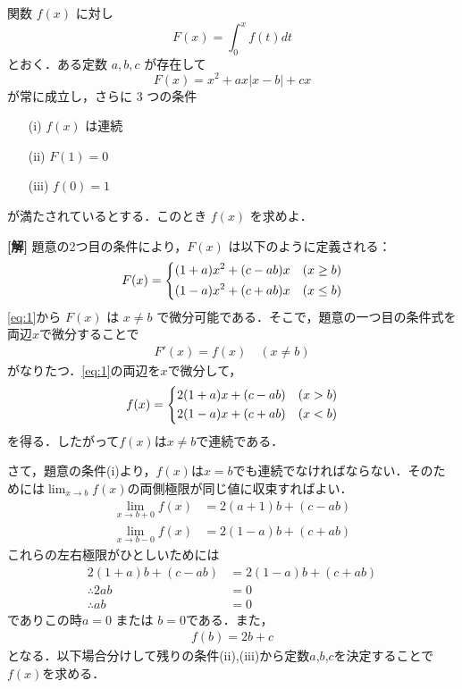 \documentclass[a4paper,10pt]{ltjsarticle}
\begin{document}
\begin{oframed}
関数 $f(x)$ に対し
\[ F(x) = \int_0^x f(t)dt \]
とおく．ある定数 $a, b, c$ が存在して
\[ F(x) = x^2 + ax|x-b| + cx \]
が常に成立し，さらに $3$ つの条件
\begin{enumerate}
    \item[(i)] $f(x)$ は連続
    \item[(ii)] $F(1) = 0$
    \item[(iii)] $f(0) = 1$
\end{enumerate}
が満たされているとする．このとき $f(x)$ を求めよ．
\end{oframed}
\setlength{\columnseprule}{0.4pt}
\begin{multicols}{2}
{\bf[解]}
題意の2つ目の条件により，$F(x)$ は以下のように定義される：
\begin{align}\label{eq:1}
F(x) = 
\begin{dcases}
(1+a)x^2 + (c-ab)x & (x \ge b)   \\
(1-a)x^2 + (c+ab)x & (x \le b)  
\end{dcases}
\end{align}
\cref{eq:1}から $F(x)$ は $x\neq b$ で微分可能である．そこで，題意の一つ目の条件式を両辺$x$で微分することで
\begin{align}
F'(x) = f(x) \quad (x \ne b)
\end{align}
がなりたつ．\cref{eq:1}の両辺を$x$で微分して，
\begin{align}\label{eq:2}
f(x) = 
\begin{dcases}
2(1+a)x + (c-ab) & (x > b) \\
2(1-a)x + (c+ab) & (x < b)
\end{dcases}
\end{align}
を得る．したがって$f(x)$は$x\neq b$で連続である．

さて，題意の条件(i)より，$f(x)$は$x=b$でも連続でなければならない．そのためには$\displaystyle \lim_{x\to b} f(x)$の両側極限が同じ値に収束すればよい．
\begin{align*}
\lim_{x \to b+0} f(x) &= 2(a+1)b + (c-ab) \\
\lim_{x \to b-0} f(x) &= 2(1-a)b + (c+ab)
\end{align*}
これらの左右極限がひとしいためには
\begin{align*}
2(1+a)b + (c-ab) &= 2(1-a)b + (c+ab) \\
\therefore 2ab &= 0 \\
\therefore ab &= 0 
\end{align*}
でありこの時$a=0$ または $b=0$である．また，
\begin{align}
f(b) = 2b+c
\end{align}
となる．以下場合分けして残りの条件(ii),(iii)から定数$a$,$b$,$c$を決定することで$f(x)$を求める．


\end{multicols}
\end{document}
